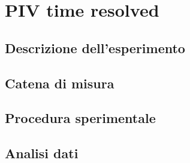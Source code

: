 \section{PIV time resolved}

\subsection{Descrizione dell'esperimento}

\subsection{Catena di misura}

\subsection{Procedura sperimentale}

\subsection{Analisi dati}